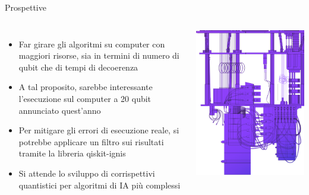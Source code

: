 \documentclass{beamer}
\begin{document}
    \begin{frame}{Prospettive}
        \begin{columns}
            \begin{itemize}
                \item Far girare gli algoritmi su computer con maggiori risorse, sia in termini di numero di qubit che di tempi di decoerenza
                \item A tal proposito, sarebbe interessante l'esecuzione sul computer a 20 qubit annunciato quest'anno
                \item Per mitigare gli errori di esecuzione reale, si potrebbe applicare un filtro sui risultati tramite la libreria qiskit-ignis
                \item Si attende lo sviluppo di corrispettivi quantistici per algoritmi di IA più complessi
            \end{itemize}
            \includegraphics[width=\linewidth]{gfx/quantum_computer.png}
        \end{columns}
    \end{frame}
\end{document}
